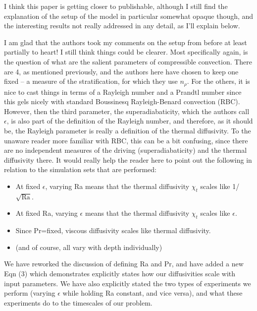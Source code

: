 \documentclass[aps, 11pt, singlecolumn]{revtex4-1} %
\begin{document}
\begin{singlespace}
\begin{myquotation}
I think this paper is getting closer to publishable, although I still
find the explanation of the setup of the model in particular somewhat
opaque though, and the interesting results not really addressed in any
detail, as I'll explain below.

I am glad that the authors took my comments on the setup from before
at least partially to heart! I still think things could be clearer.
Most specifically again, is the question of what are the salient
parameters of compressible convection. There are 4, as mentioned
previously, and the authors here have chosen to keep one fixed -- a
measure of the stratification, for which they use $n_\rho$. For the
others, it is nice to cast things in terms of a Rayleigh number and a
Prandtl number since this gels nicely with standard Boussinesq
Rayleigh-Benard convection (RBC). However, then the third parameter,
the superadiabaticity, which the authors call $\epsilon$, is also part of
the definition of the Rayleigh number, and therefore, as it should be,
the Rayleigh parameter is really a definition of the thermal
diffusivity. To the unaware reader more familiar with RBC, this can be
a bit confusing, since there are no independent measures of the
driving (superadiabaticity) and the thermal diffusivity there. It
would really help the reader here to point out the following in
relation to the simulation sets that are performed:

\begin{itemize}
\item At fixed $\epsilon$, varying Ra means that the thermal diffusivity $\chi_t$
scales like 1/$\sqrt{\text{Ra}}$.
\item At fixed Ra, varying $\epsilon$ means that the thermal diffusivity $\chi_t$
scales like $\epsilon$.
\item Since Pr=fixed, viscous diffusivity scales like thermal diffusivity.
\item (and of course, all vary with depth individually)
\end{itemize}
\end{myquotation}
We have reworked the discussion of defining Ra and Pr, and have added
a new Eqn (3) which demonstrates explicitly states how our diffusivities
scale with input parameters.  We have also explicitly stated the two types
of experiments we perform (varying $\epsilon$ while holding Ra constant,
and vice versa), and what these experiments do to the timescales of
our problem.


\end{singlespace}
\end{document}
